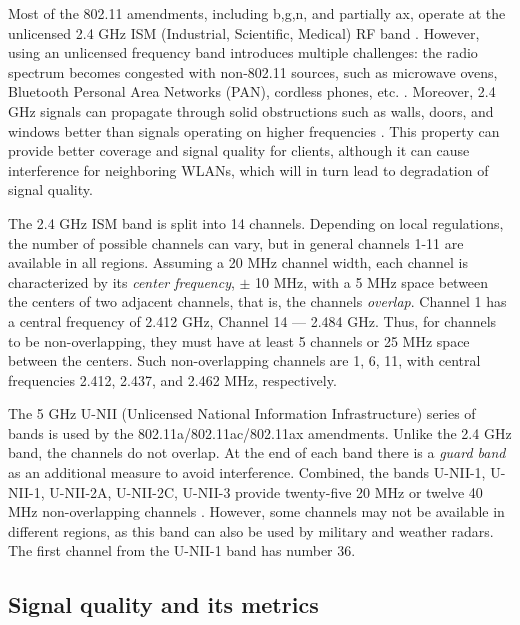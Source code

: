 Most of the 802.11 amendments, including b,g,n, and partially ax, operate at the unlicensed 2.4 GHz ISM (Industrial, Scientific, Medical) RF band \cite{tanenbaumComputerNetworks2020, colemanCWNACertifiedWireless2021}. However, using an unlicensed frequency band introduces multiple challenges: the radio spectrum becomes congested with non-802.11 sources, such as microwave ovens, Bluetooth Personal Area Networks (PAN), cordless phones, etc. \cite{tanenbaumComputerNetworks2020, colemanCWNACertifiedWireless2021}. Moreover, 2.4 GHz signals can propagate through solid obstructions such as walls, doors, and windows better than signals operating on higher frequencies \cite{colemanCWNACertifiedWireless2021}. This property can provide better coverage and signal quality for clients, although it can cause interference for neighboring WLANs, which will in turn lead to degradation of signal quality.

The 2.4 GHz ISM band is split into 14 channels. Depending on local regulations, the number of possible channels can vary, but in general channels 1-11 are available in all regions. Assuming a 20 MHz channel width, each channel is characterized by its \textit{center frequency}, $\pm$ 10 MHz, with a 5 MHz space between the centers of two adjacent channels, that is, the channels \textit{ overlap}. Channel 1 has a central frequency of 2.412 GHz, Channel 14 — 2.484 GHz. Thus, for channels to be non-overlapping, they must have at least 5 channels or 25 MHz space between the centers. Such non-overlapping channels are 1, 6, 11, with central frequencies 2.412, 2.437, and 2.462 MHz, respectively.

The 5 GHz U-NII (Unlicensed National Information Infrastructure) series of bands is used by the 802.11a/802.11ac/802.11ax amendments. Unlike the 2.4 GHz band, the channels do not overlap. At the end of each band there is a \textit{guard band} as an additional measure to avoid interference. Combined, the bands U-NII-1, U-NII-1, U-NII-2A, U-NII-2C, U-NII-3 provide twenty-five 20 MHz or twelve 40 MHz non-overlapping channels \cite{colemanCWNACertifiedWireless2021}. However, some channels may not be available in different regions, as this band can also be used by military and weather radars. The first channel from the U-NII-1 band has number 36.


\subsection{Signal quality and its metrics}

